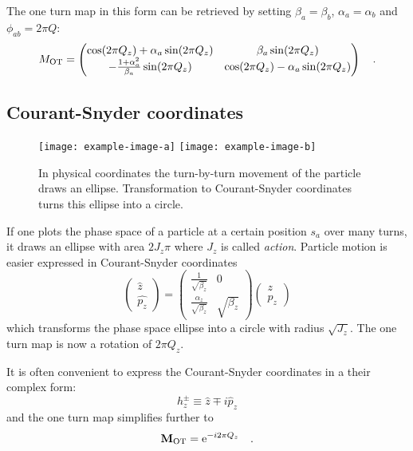 The one turn map in this form can be retrieved by setting $\beta_a = \beta_b $, $\alpha_a = \alpha_b$
and $\phi_{ab} = 2\pi Q$:
%
\begin{equation}
    M_\text{OT} = \begin{pmatrix}
        \cos(2\pi Q_z) + \alpha_a \sin(2\pi Q_z) & \beta_a\sin(2\pi Q_z) \\
        -\frac{1+\alpha_a^2}{\beta_a}\sin(2\pi Q_z) & \cos(2\pi Q_z) - \alpha_a\sin(2\pi Q_z)
    \end{pmatrix}
    \quad .
\end{equation}
%
\subsection{Courant-Snyder coordinates}
%
\begin{figure}[h]
    \centering
    \texttt{[image: example-image-a]}
    \hspace{1em}
    \texttt{[image: example-image-b]}
    \caption{In physical coordinates the turn-by-turn movement of the particle draws an ellipse.
        Transformation to Courant-Snyder
        coordinates turns this ellipse into a circle.}
    \label{fig_phase_space_ellipse}
\end{figure}
%
If one plots the phase space of a particle at a certain position $s_a$ over many turns, it draws an
ellipse with area $2J_z\pi$ where $J_z$ is called \emph{action}.
Particle motion is easier expressed in Courant-Snyder coordinates
%
\begin{equation}
    \begin{pmatrix}
        \hat{z}\\
        \hat{p_z}
    \end{pmatrix}
    =
    \begin{pmatrix}
        \frac{1}{\sqrt{\beta_z}} & 0\\
        \frac{\alpha_z}{\sqrt{\beta_z}} & \sqrt{\beta_z}
    \end{pmatrix}
    \begin{pmatrix}
        z\\
        p_z
    \end{pmatrix}
\end{equation}
%
which transforms the phase space ellipse into a circle with radius $\sqrt{J_z}$.
The one turn map is now a rotation of $2\pi Q_z$. 

It is often convenient to express the Courant-Snyder coordinates in a their complex form:
%
\begin{equation}
    h^\pm_z \equiv \hat{z} \mp i \hat{p}_z
\end{equation}
%
and the one turn map simplifies further to
%
\begin{equation}
    \mathbf{M}_\text{OT} = \text{e}^{-i2\pi Q_z}
    \quad .
\end{equation}
